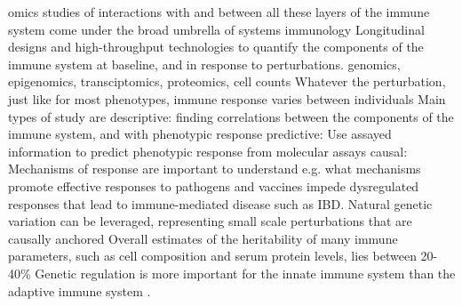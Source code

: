 \begin{outline}
\1 omics studies of interactions with and between all these layers of the immune system come under the broad umbrella of systems immunology
    \2 Longitudinal designs and high-throughput technologies to quantify the components of the immune system at baseline, and in response to perturbations.
        \3 genomics, epigenomics, transciptomics, proteomics, cell counts
    \2 Whatever the perturbation, just like for most phenotypes, immune response varies between individuals
    \2 Main types of study are descriptive:
        \3 finding correlations between the components of the immune system, and with phenotypic response
    \2 predictive:
        \3 Use assayed information to predict phenotypic response from molecular assays
    \2 causal:
        \3 Mechanisms of response are important to understand e.g. 
            \4 what mechanisms promote effective responses to pathogens and vaccines
            \4 impede dysregulated responses that lead to immune-mediated disease such as IBD.
    \2 Natural genetic variation can be leveraged, representing small scale perturbations that are causally anchored \autocite{tsang2015UtilizingPopulationVariation,villani2018SystemsImmunologyLearning}
        \3 Overall estimates of the heritability of many immune parameters, such as cell composition and serum protein levels, lies between 20-40\% \autocite{liston2016ShapingVariationHuman,brodin2017HumanImmuneSystem,patin2018NaturalVariationParameters,liston2018OriginsDiversityHuman}
        \3 Genetic regulation is more important for the innate immune system than the adaptive immune system \autocite{patin2018NaturalVariationParameters}.


\end{outline}

